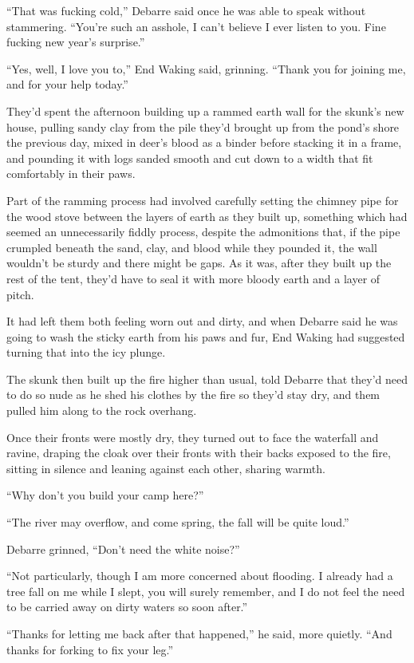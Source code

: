 ``That was fucking cold,'' Debarre said once he was able to speak without stammering. ``You're such an asshole, I can't believe I ever listen to you. Fine fucking new year's surprise.''

``Yes, well, I love you to,'' End Waking said, grinning. ``Thank you for joining me, and for your help today.''

They'd spent the afternoon building up a rammed earth wall for the skunk's new house, pulling sandy clay from the pile they'd brought up from the pond's shore the previous day, mixed in deer's blood as a binder before stacking it in a frame, and pounding it with logs sanded smooth and cut down to a width that fit comfortably in their paws.

Part of the ramming process had involved carefully setting the chimney pipe for the wood stove between the layers of earth as they built up, something which had seemed an unnecessarily fiddly process, despite the admonitions that, if the pipe crumpled beneath the sand, clay, and blood while they pounded it, the wall wouldn't be sturdy and there might be gaps. As it was, after they built up the rest of the tent, they'd have to seal it with more bloody earth and a layer of pitch.

It had left them both feeling worn out and dirty, and when Debarre said he was going to wash the sticky earth from his paws and fur, End Waking had suggested turning that into the icy plunge.

The skunk then built up the fire higher than usual, told Debarre that they'd need to do so nude as he shed his clothes by the fire so they'd stay dry, and them pulled him along to the rock overhang.

Once their fronts were mostly dry, they turned out to face the waterfall and ravine, draping the cloak over their fronts with their backs exposed to the fire, sitting in silence and leaning against each other, sharing warmth.

``Why don't you build your camp here?''

``The river may overflow, and come spring, the fall will be quite loud.''

Debarre grinned, ``Don't need the white noise?''

``Not particularly, though I am more concerned about flooding. I already had a tree fall on me while I slept, you will surely remember, and I do not feel the need to be carried away on dirty waters so soon after.''

``Thanks for letting me back after that happened,'' he said, more quietly. ``And thanks for forking to fix your leg.''

